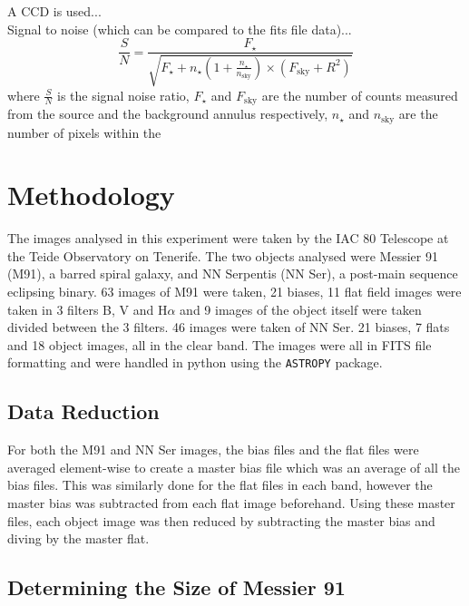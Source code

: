 \documentclass[%
reprint,
amsmath,amssymb,
aps,
]{revtex4-2}
\begin{document}
			A CCD is used...\\
			
			Signal to noise (which can be compared to the fits file data)...\\
			
			\begin{equation}
				\frac{S}{N} = \frac{F_\star}{\sqrt{F_\star + n_\star \left( 1 + \frac{n_\star}{n_\text{sky}}\right) \times \left(F_\text{sky} + R^2\right)}}
			\end{equation}where $\frac{S}{N}$ is the signal noise ratio, $F_\star$ and $F_\text{sky}$ are the number of counts measured from the source and the background annulus respectively, $n_\star$ and $n_\text{sky}$ are the number of pixels within the  
	 
	\section{Methodology}
	
		The images analysed in this experiment were taken by the IAC 80 Telescope at the Teide Observatory on Tenerife. The two objects analysed were Messier 91 (M91), a barred spiral galaxy\cite{messier}, and NN Serpentis (NN Ser), a post-main sequence eclipsing binary\cite{Horner_2012}. 63 images of M91 were taken, 21 biases, 11 flat field images were taken in 3 filters B, V and H$\alpha$ and 9 images of the object itself were taken divided between the 3 filters. 46 images were taken of NN Ser. 21 biases, 7 flats and 18 object images, all in the clear band. The images were all in FITS file formatting and were handled in python using the \texttt{ASTROPY} package.
	
		\subsection{Data Reduction}
			
			 For both the M91 and NN Ser images, the bias files and the flat files were averaged element-wise to create a master bias file which was an average of all the bias files. This was similarly done for the flat files in each band, however the master bias was subtracted from each flat image beforehand. Using these master files, each object image was then reduced by subtracting the master bias and diving by the master flat.
		
		\subsection{Determining the Size of Messier 91}
			
\end{document}
